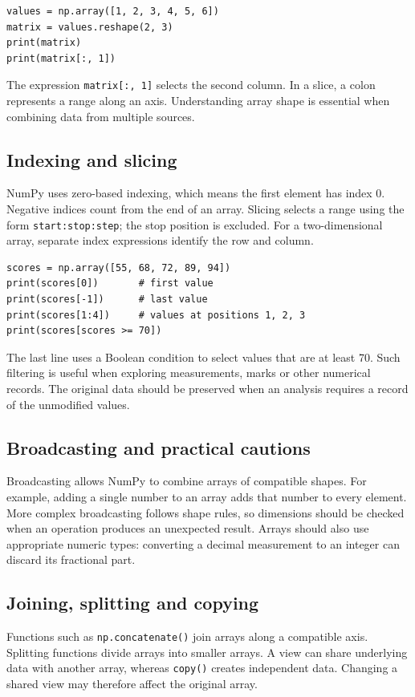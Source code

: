 \documentclass[11pt,openany,oneside]{book}
\begin{document}
\begin{lstlisting}[style=pythonstyle]
values = np.array([1, 2, 3, 4, 5, 6])
matrix = values.reshape(2, 3)
print(matrix)
print(matrix[:, 1])
\end{lstlisting}
The expression \texttt{matrix[:, 1]} selects the second column. In a slice, a colon represents a range along an axis. Understanding array shape is essential when combining data from multiple sources.

\subsection{Indexing and slicing}
NumPy uses zero-based indexing, which means the first element has index 0. Negative indices count from the end of an array. Slicing selects a range using the form \texttt{start:stop:step}; the stop position is excluded. For a two-dimensional array, separate index expressions identify the row and column.

\begin{lstlisting}[style=pythonstyle]
scores = np.array([55, 68, 72, 89, 94])
print(scores[0])       # first value
print(scores[-1])      # last value
print(scores[1:4])     # values at positions 1, 2, 3
print(scores[scores >= 70])
\end{lstlisting}
The last line uses a Boolean condition to select values that are at least 70. Such filtering is useful when exploring measurements, marks or other numerical records. The original data should be preserved when an analysis requires a record of the unmodified values.

\subsection{Broadcasting and practical cautions}
Broadcasting allows NumPy to combine arrays of compatible shapes. For example, adding a single number to an array adds that number to every element. More complex broadcasting follows shape rules, so dimensions should be checked when an operation produces an unexpected result. Arrays should also use appropriate numeric types: converting a decimal measurement to an integer can discard its fractional part.

\subsection{Joining, splitting and copying}
Functions such as \texttt{np.concatenate()} join arrays along a compatible axis. Splitting functions divide arrays into smaller arrays. A view can share underlying data with another array, whereas \texttt{copy()} creates independent data. Changing a shared view may therefore affect the original array.
\end{document}
